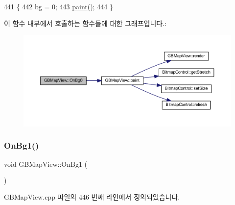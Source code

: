 \begin{DoxyCode}
441 \{
442   bg = 0;
443   \mbox{\hyperlink{class_g_b_map_view_a42de669273417186b01ca6f8d06eb347}{paint}}();
444 \}
\end{DoxyCode}
이 함수 내부에서 호출하는 함수들에 대한 그래프입니다.\+:
\nopagebreak
\begin{figure}[H]
\begin{center}
\leavevmode
\includegraphics[width=350pt]{class_g_b_map_view_a7e9247c42189f718f173f765c4d5a5ba_cgraph}
\end{center}
\end{figure}
\mbox{\label{class_g_b_map_view_a8cbe9a5f305ebaff40a3a345f444ef98}} 
\subsubsection{\texorpdfstring{On\+Bg1()}{OnBg1()}}
{\footnotesize\ttfamily void G\+B\+Map\+View\+::\+On\+Bg1 (\begin{DoxyParamCaption}{ }\end{DoxyParamCaption})\hspace{0.3cm}{\ttfamily [protected]}}



G\+B\+Map\+View.\+cpp 파일의 446 번째 라인에서 정의되었습니다.


